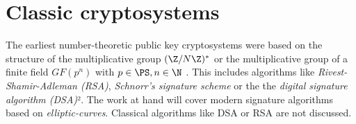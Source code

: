 \section{Classic cryptosystems}

The earliest number-theoretic public key cryptosystems were based on the structure of the multiplicative group $(\Z/N\Z)^*$ or the multiplicative group of a finite field $GF(p^n)$ with $p \in \PS, n \in \N$ \cite{bruce867}. This includes algorithms like \emph{Rivest-Shamir-Adleman (RSA)}, \emph{Schnorr's signature scheme} or the the \emph{digital signature algorithm (DSA)}². The work at hand will cover modern signature algorithms based on \emph{elliptic-curves}. Classical algorithms like DSA or RSA are not discussed.
